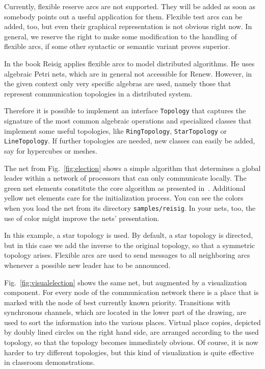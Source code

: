 Currently, flexible reserve arcs are not supported.
They will be added as soon as somebody points out
a useful application for them.
Flexible test arcs can be added, too,
but even their graphical representation is not obvious right now.
In general, we reserve the right to make some modification to the
handling of flexible arcs, if some other syntactic or
semantic variant proves superior.


In the book \cite{reisig98} Reisig applies flexible arcs to
model distributed algorithms. He uses algebraic Petri nets, which
are in general not accessible for Renew. However, in the
given context only very specific algebras are used, namely
those that represent communication topologies in a distributed
system.

Therefore it is possible to implement an interface
\texttt{Topology} that captures the signature of the
most common algebraic operations and specialized classes
that implement some useful topologies, like \texttt{RingTopology},
\texttt{StarTopology} or \texttt{LineTopology}. If further topologies
are needed, new classes can easily be added, say for hypercubes
or meshes.


The net from Fig.~\ref{fig:election} shows a simple algorithm that
determines a global leader within a network of processors
that can only communicate locally. The green net elements constitute
the core algorithm as presented in~\cite{reisig98}. Additional yellow
net elements care for the initialization process. You can see the colors
when you load the net from its directory \texttt{samples/reisig}.
In your nets, too, the use of color might improve the nets'
presentation.

In this example, a star topology is used. By default, a star topology is
directed, but in this case we add the inverse to the original
topology, so that a symmetric topology arises. Flexible arcs are used
to send messages to all neighboring arcs whenever a
possible new leader has to be announced.

Fig.~\ref{fig:visualelection} shows the same net, but augmented
by a visualization component. For every node of the communication
network there is a place that is marked with the node of
best currently known priority. Transitions with
synchronous channels, which are located in the lower part of
the drawing, are used to
sort the information into the various places. Virtual place copies,
depicted by doubly lined circles on the right hand side,
are arranged according to the used topology, so that the topology
becomes immediately obvious. Of course, it is now harder to try different
topologies, but this kind of visualization is quite effective
in classroom demonstrations.

